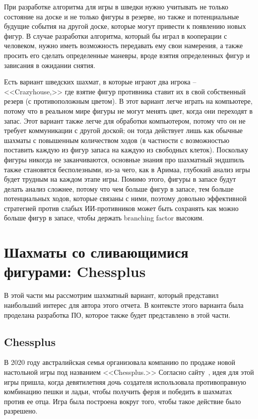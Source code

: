 \documentclass{article}
\begin{document}
При разработке алгоритма для игры в шведки нужно учитывать не только состояние на доске
и не только фигуры в резерве,
но также и потенциальные будущие события на другой доске,
которые могут привести к появлению новых фигур.
В случае разработки алгоритма, который бы играл в кооперации с человеком,
нужно иметь возможность передавать ему свои намерения,
а также просить его сделать определенные маневры,
вроде взятия определенных фигур и зависания в ожидании снятия.

Есть вариант шведских шахмат, в которые играют два игрока -- <<Crazyhouse,>>
где взятие фигур противника ставит их в свой собственный резерв (с противоположным цветом).
В этот вариант легче играть на компьютере, потому что в реальном мире фигуры не могут менять цвет, когда они переходят в запас.
Этот вариант также легче для обработки компьютером, потому что он не требует
коммуникации с другой доской;
он тогда действует лишь как обычные шахматы с повышенным количеством ходов (в частности с возможностью поставить каждую из фигур запаса на каждую из свободных клеток).
Поскольку фигуры никогда не заканчиваются,
основные знания про шахматный эндшпиль также становятся бесполезными,
из-за чего, как в Аримаа, глубокий анализ игры будет трудным на каждом этапе игры.
Помимо этого, фигуры в запасе будут делать анализ сложнее,
потому что чем больше фигур в запасе, тем больше потенциальных ходов, которые связаны с ними,
поэтому довольно эффективной стратегией против слабых ИИ-противников может быть сохранять как можно больше фигур в запасе,
чтобы держать branching factor высоким.

\section{Шахматы со сливающимися фигурами: Chessplus}

В этой части мы рассмотрим шахматный вариант,
который представил наибольший интерес для автора этого отчета.
В контексте этого варианта была проделана разработка ПО,
которое также будет представлено в этой части.

\subsection{Chessplus}

В 2020 году австралийская семья организовала компанию по продаже новой настольной игры под названием <<Chessplus.>> 
Согласно сайту~\cite{chessplus-site}, идея для этой игры пришла, когда девятилетняя дочь создателя использовала противоправную комбинацию пешки и ладьи,
чтобы получить ферзя и победить в шахматах против ее отца.
Игра была построена вокруг того, чтобы такое действие было разрешено.
\end{document}
